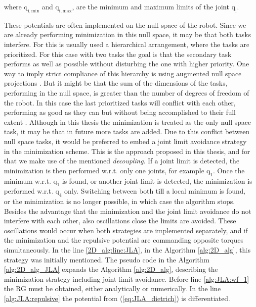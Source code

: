 where $\mathrm{q_{i,min}}$ and $\mathrm{q_{i,max}}$, are the minimum and maximum limits of the joint $\mathrm{q_i}$.



These potentials are often implemented on the null space of the robot. Since we are already performing minimization in this null space, it may be that both tasks interfere. For this is usually used a hierarchical arrangement, where the tasks are prioritized. For this case with two tasks the goal is that the secondary task performs as well as possible without disturbing the one with higher priority. One way to imply strict compliance of this hierarchy is using augmented null space projections \cite{JLA_5}. But it might be that the sum of the dimensions of the tasks, performing in the null space, is greater than the number of degrees of freedom of the robot. In this case the last prioritized tasks will conflict with each other,  performing as good as they can but without being accomplished to their full extent \cite{JLA_5}. Although in this thesis the minimization is treated as the only null space task, it may be that in future more tasks are added. 
Due to this conflict between null space tasks, it would be preferred to embed a joint limit avoidance strategy in the minimization scheme. This is the approach proposed in this thesis, and for that we make use of the mentioned \textit{decoupling}. If  a joint limit is detected, the minimization is then performed w.r.t. only one joints, for example $\mathrm{q_1}$. Once the minimum w.r.t. $\mathrm{q_1}$ is found, or another joint limit is detected, the minimization is performed w.r.t. $\mathrm{q_4}$ only. Switching between both till a local minimum is found, or the minimization is no longer possible, in which case the algorithm stops.
Besides the advantage that the minimization and the joint limit avoidance do not interfere with each other, also oscillations close the limits are avoided. These oscillations would occur when both strategies are implemented separately, and if the minimization and the repulsive potential are commanding opposite torques simultaneously. In the line \ref{2D_alg:line:JLA}, in the Algorithm \ref{alg:2D_alg}, this strategy was initially mentioned. The pseudo code in the Algorithm \ref{alg:2D_alg_JLA} expands the Algorithm \ref{alg:2D_alg}, describing the  minimization strategy including joint limit avoidance. Before  line \ref{alg:JLA:wf_1} the RG must be obtained, either analytically or numerically. In the line \ref{alg:JLA:repulsive} the potential from (\ref{eq:JLA_dietrich}) is differentiated.





